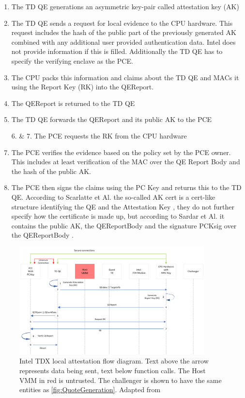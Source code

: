 \begin{enumerate}
    \item The TD QE generations an asymmetric key-pair called attestation key (AK)
    \item The TD QE sends a request for local evidence to the CPU hardware. This request includes the hash of the public part of the previously generated AK combined with any additional user provided authentication data. Intel does not provide information if this is filled. Additionally the TD QE has to specify the verifying enclave as the PCE.
    \item The CPU packs this information and claims about the TD QE and MACs it using the Report Key (RK) into the QEReport.
    \item The QEReport is returned to the TD QE
    \item The TD QE forwards the QEReport and its public AK to the PCE
    \item[6. \& 7.] The PCE requests the RK from the CPU hardware
    \item The PCE verifies the evidence based on the policy set by the PCE owner. This includes at least verification of the MAC over the QE Report Body and the hash of the public AK.
    \item The PCE then signs the claims using the PC Key and returns this to the TD QE. According to Scarlatte et Al.  the so-called AK cert is a cert-like structure identifying the QE and the Attestation Key \cite{scarlata_supporting_nodate}, they do not further specify how the certificate is made up, but according to Sardar et Al.  it contains the public AK, the QEReportBody and the signature PCKsig over the QEReportBody \cite{sardar_formal_spec_ARM_2024}.
    
\end{enumerate}

\begin{figure}
\centering
\includegraphics[width=0.9\textwidth]{figures/Local Attestation.png}
\caption{Intel TDX local attestation flow diagram. Text above the arrow represents data being sent, text below function calls. The Host VMM in red is untrusted. The challenger is shown to have the same entities as \cref{fig:QuoteGeneration}. Adapted from \cite{sardar_formal_2023}}
\label{fig:local-attestation}
\end{figure}

